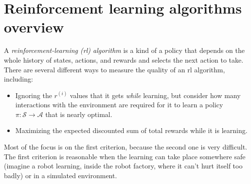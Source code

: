 

\section{Reinforcement learning algorithms overview}
\label{rl}

A {\em reinforcement-learning ({\sc rl})
    algorithm} is a kind of a
policy that depends on the whole history of states, actions, and
rewards and selects the next action to take. There are several
different ways to measure the quality of an {\sc rl} algorithm,
including:
\begin{itemize}
  \item Ignoring the $r^{(i)}$ values that it gets {\em while} learning,
        but consider how many interactions with the environment are
        required for it to learn a policy $\pi: \mathcal{S} \rightarrow
          \mathcal{A}$ that is nearly optimal.
  \item Maximizing the expected discounted sum of total rewards while
        it is learning.
\end{itemize}
Most of the focus is on the first criterion, because the second one is
very difficult.  The first criterion is reasonable when the learning
can take place somewhere safe (imagine a robot learning, inside the
robot factory, where it can't hurt itself too badly) or in a simulated
environment.

